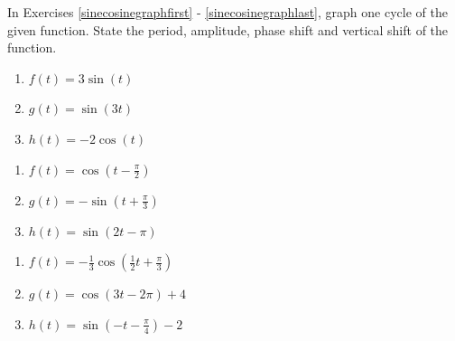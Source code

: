 In Exercises \ref{sinecosinegraphfirst} - \ref{sinecosinegraphlast}, graph one cycle of the given function.  State the period, amplitude, phase shift and vertical shift of the function.

\begin{multicols}{3}

\begin{enumerate}

\item $f(t) = 3\sin(t)$ \label{sinecosinegraphfirst}
\item $g(t) = \sin(3t)$
\item $h(t)  = -2\cos(t)$

\setcounter{HW}{\value{enumi}}

\end{enumerate}

\end{multicols}

\begin{multicols}{3}

\begin{enumerate}

\setcounter{enumi}{\value{HW}}

\item $f(t)  = \cos \left( t - \frac{\pi}{2} \right)$
\item $g(t)  = -\sin \left( t + \frac{\pi}{3} \right)$
\item $h(t) = \sin(2t - \pi)$ 

\setcounter{HW}{\value{enumi}}

\end{enumerate}

\end{multicols}

\begin{multicols}{3}

\begin{enumerate}

\setcounter{enumi}{\value{HW}}

\item $f(t)  = -\frac{1}{3}\cos \left( \frac{1}{2}t + \frac{\pi}{3} \right)$
\item $g(t) = \cos (3t - 2\pi) + 4$ 
\item $h(t)  = \sin \left( -t - \frac{\pi}{4} \right) - 2$ 

\setcounter{HW}{\value{enumi}}

\end{enumerate}

\end{multicols}

